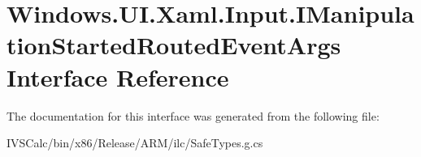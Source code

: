 \hypertarget{interface_windows_1_1_u_i_1_1_xaml_1_1_input_1_1_i_manipulation_started_routed_event_args}{}\section{Windows.\+U\+I.\+Xaml.\+Input.\+I\+Manipulation\+Started\+Routed\+Event\+Args Interface Reference}
\label{interface_windows_1_1_u_i_1_1_xaml_1_1_input_1_1_i_manipulation_started_routed_event_args}


The documentation for this interface was generated from the following file\+:\begin{DoxyCompactItemize}
\item 
I\+V\+S\+Calc/bin/x86/\+Release/\+A\+R\+M/ilc/Safe\+Types.\+g.\+cs\end{DoxyCompactItemize}
